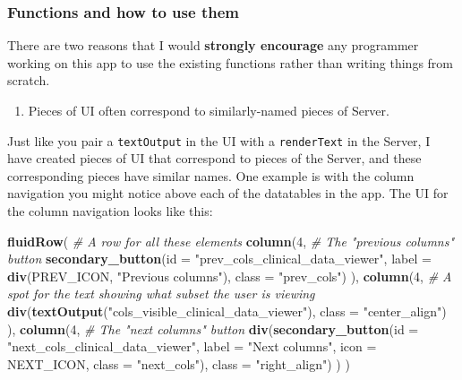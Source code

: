 \documentclass[]{article}
\newenvironment{Shaded}{\begin{snugshade}}{\end{snugshade}}
\newcommand{\KeywordTok}[1]{\textcolor[rgb]{0.13,0.29,0.53}{\textbf{#1}}}
\newcommand{\DataTypeTok}[1]{\textcolor[rgb]{0.13,0.29,0.53}{#1}}
\newcommand{\DecValTok}[1]{\textcolor[rgb]{0.00,0.00,0.81}{#1}}
\newcommand{\StringTok}[1]{\textcolor[rgb]{0.31,0.60,0.02}{#1}}
\newcommand{\CommentTok}[1]{\textcolor[rgb]{0.56,0.35,0.01}{\textit{#1}}}
\newcommand{\NormalTok}[1]{#1}
\providecommand{\tightlist}{%
  \setlength{\itemsep}{0pt}\setlength{\parskip}{0pt}}
\begin{document}
\hypertarget{tidygeo-functions}{\subsubsection{Functions and how to use
them}\label{tidygeo-functions}}

There are two reasons that I would \textbf{strongly encourage} any
programmer working on this app to use the existing functions rather than
writing things from scratch.

\begin{enumerate}
\def\labelenumi{\arabic{enumi}.}
\tightlist
\item
  Pieces of UI often correspond to similarly-named pieces of Server.
\end{enumerate}

Just like you pair a \texttt{textOutput} in the UI with a
\texttt{renderText} in the Server, I have created pieces of UI that
correspond to pieces of the Server, and these corresponding pieces have
similar names. One example is with the column navigation you might
notice above each of the datatables in the app. The UI for the column
navigation looks like this:

\begin{Shaded}
\begin{Highlighting}[]
\KeywordTok{fluidRow}\NormalTok{( }\CommentTok{# A row for all these elements}
    \KeywordTok{column}\NormalTok{(}\DecValTok{4}\NormalTok{, }\CommentTok{# The "previous columns" button}
      \KeywordTok{secondary_button}\NormalTok{(}\DataTypeTok{id =} \StringTok{"prev_cols_clinical_data_viewer"}\NormalTok{, }\DataTypeTok{label =} \KeywordTok{div}\NormalTok{(PREV_ICON, }\StringTok{"Previous columns"}\NormalTok{), }\DataTypeTok{class =} \StringTok{"prev_cols"}\NormalTok{)}
\NormalTok{    ),}
    \KeywordTok{column}\NormalTok{(}\DecValTok{4}\NormalTok{, }\CommentTok{# A spot for the text showing what subset the user is viewing}
      \KeywordTok{div}\NormalTok{(}\KeywordTok{textOutput}\NormalTok{(}\StringTok{"cols_visible_clinical_data_viewer"}\NormalTok{), }\DataTypeTok{class =} \StringTok{"center_align"}\NormalTok{)}
\NormalTok{    ),}
    \KeywordTok{column}\NormalTok{(}\DecValTok{4}\NormalTok{, }\CommentTok{# The "next columns" button}
      \KeywordTok{div}\NormalTok{(}\KeywordTok{secondary_button}\NormalTok{(}\DataTypeTok{id =} \StringTok{"next_cols_clinical_data_viewer"}\NormalTok{, }\DataTypeTok{label =} \StringTok{"Next columns"}\NormalTok{, }\DataTypeTok{icon =}\NormalTok{ NEXT_ICON, }\DataTypeTok{class =} \StringTok{"next_cols"}\NormalTok{), }\DataTypeTok{class =} \StringTok{"right_align"}\NormalTok{)}
\NormalTok{    )}
\NormalTok{  )}
\end{Highlighting}
\end{Shaded}
\end{document}
